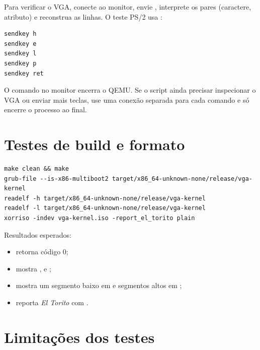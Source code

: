 Para verificar o VGA, conecte ao monitor, envie
, interprete os pares (caractere, atributo) e
reconstrua as linhas. O teste PS/2 usa :

\begin{lstlisting}[style=shell,caption={Envio de teclas pelo monitor do QEMU.},label={lst:sendkey}]
sendkey h
sendkey e
sendkey l
sendkey p
sendkey ret
\end{lstlisting}

\begin{atencao}
O comando  no monitor encerra o QEMU. Se o script ainda precisar
inspecionar o VGA ou enviar mais teclas, use uma conex\~ao separada para cada
comando e s\'o encerre o processo ao final.
\end{atencao}

\section{Testes de build e formato}

\begin{lstlisting}[style=shell,caption={Comandos de valida\c{c}\~ao estrutural.},label={lst:testbuild}]
make clean && make
grub-file --is-x86-multiboot2 target/x86_64-unknown-none/release/vga-kernel
readelf -h target/x86_64-unknown-none/release/vga-kernel
readelf -l target/x86_64-unknown-none/release/vga-kernel
xorriso -indev vga-kernel.iso -report_el_torito plain
\end{lstlisting}

Resultados esperados:

\begin{itemize}
  \item {} retorna c\'odigo 0;
  \item {} mostra ,  e ;
  \item {} mostra um segmento baixo em  e
        segmentos altos em ;
  \item {} reporta \emph{El Torito} com
        .
\end{itemize}

\section{Limita\c{c}\~oes dos testes}

